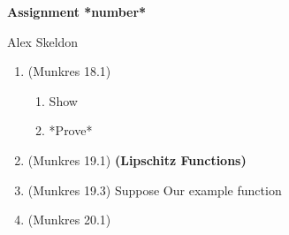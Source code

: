 \documentclass[11pt]{article}
\newcommand{\mytitlecompact}[1]{{

\hfill
{\Large \sffamily \bfseries{#1}}
\hfill
}}
\begin{document}
\mytitlecompact{Assignment *number*}
\nolinebreak \begin{center} Alex Skeldon \end{center}

\begin{enumerate}

\item (Munkres 18.1)
\begin{enumerate}
\item Show 
\newline \text{\qquad} 
\item *Prove*
\end{enumerate}

\item (Munkres 19.1) \textbf{(Lipschitz Functions)}

\item (Munkres 19.3) Suppose
\newline \text{\qquad} Our example function

\item (Munkres 20.1)

\end{enumerate}
\end{document}
